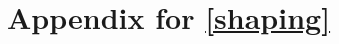 
\graphicspath{ {\thisch/figures/} }

\chapter{Appendix for \autoref{shaping}}%
\label{appx:shaping}

\FloatBarrier%

\FloatBarrier%

\FloatBarrier%




